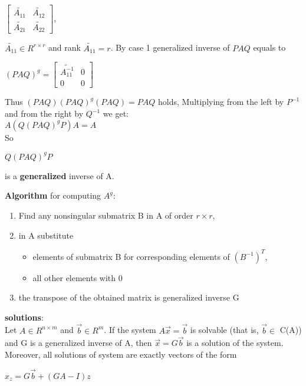 \documentclass{article}
\begin{document}
\begin{multicols}{2}
\begin{enumerate}
\begin{center}
\begin{math}
\begin{bmatrix}
					      \tilde{A_{11}} & \tilde{A_{12}} \\
					      \tilde{A_{21}} & \tilde{A_{22}}
				      \end{bmatrix}
			      \end{math},
		      \end{center}
		      $\tilde{A_{11}} \in R^{r \times r}$ and rank $\tilde{A_{11}} = r$. By case 1
		      generalized inverse of $PAQ$ equals to
		      \begin{center}
			      \begin{math}
				      (PAQ)^g=
				      \begin{bmatrix}
					      \tilde{A_{11}^{-1}} & 0 \\
					      0                   & 0
				      \end{bmatrix}
			      \end{math}
		      \end{center}
		      Thus $(PAQ) (PAQ)^g (PAQ) = PAQ$ holds,
		      Multiplying from the left by $P^{-1}$ and from the right
		      by $Q^{-1}$ we get:\\
		      $A(Q (PAQ)^g P)A = A$\\
		      So \begin{center}
			      \begin{math}
				      Q (PAQ)^g P
			      \end{math}
		      \end{center}
		      is a \textbf{generalized} inverse of A.
	\end{enumerate}
	\textbf{Algorithm} for computing \textbf{$A^g$}:
	\begin{enumerate}
		\item Find any nonsingular submatrix B in A of order $r \times r$,
		\item in A substitute
		      \begin{itemize}
			      \item elements of submatrix B for corresponding elements of $(B^{-1})^T$,
			      \item all other elements with 0
		      \end{itemize}
		\item the transpose of the obtained matrix is generalized inverse G
	\end{enumerate}
	\textbf{solutions}:\\
	Let $A \in R^{n \times m}$ and $\vec{b} \in R^m$.
	If the system $A\vec{x} = \vec{b}$ is
	solvable (that is, $\vec{b} \in$ C(A)) and G is a
	generalized inverse of A, then $\vec{x}=G\vec{b}$ is
	a solution of the system. Moreover,
	all solutions of system are exactly vectors of the form
	\begin{center}
		\begin{math}
			x_z = G\vec{b} + (GA - I)z
		\end{math}
	\end{center}


\end{multicols}
\end{document}
